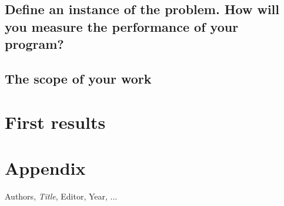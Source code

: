 \documentclass[a4paper,11pt]{report}
\begin{document}
\section{Define an instance of the problem. How will you measure the performance of your program?} 
\section{The scope of your work} 

\chapter{First results}

\chapter{Appendix}

\begin{thebibliography}{9}

  Authors,
  \emph{Title},
  Editor,
  Year,  
  ...

\end{thebibliography}
\end{document}
